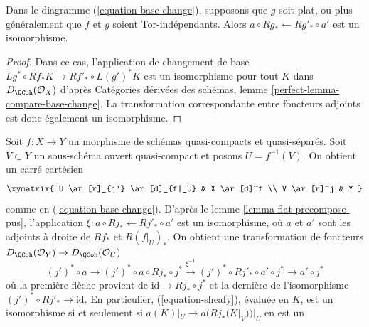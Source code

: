 \begin{lemma}
\label{lemma-flat-precompose-pus}
Dans le diagramme (\ref{equation-base-change}), supposons que $g$ soit plat, ou plus généralement que $f$ et $g$ soient Tor-indépendants. Alors $a \circ Rg_* \leftarrow Rg'_* \circ a'$ est un isomorphisme.
\end{lemma}

\begin{proof}
Dans ce cas, l'application de changement de base
$Lg^* \circ Rf_* K \longrightarrow Rf'_* \circ L(g')^*K$
est un isomorphisme pour tout $K$ dans $D_\QCoh(\mathcal{O}_X)$ d'après Catégories dérivées des schémas, lemme \ref{perfect-lemma-compare-base-change}. La transformation correspondante entre foncteurs adjoints est donc également un isomorphisme.
\end{proof}

\noindent
Soit $f : X \to Y$ un morphisme de schémas quasi-compacts et quasi-séparés. Soit $V \subset Y$ un sous-schéma ouvert quasi-compact et posons $U = f^{-1}(V)$. On obtient un carré cartésien
$$
\xymatrix{
U \ar[r]_{j'} \ar[d]_{f|_U} & X \ar[d]^f \\
V \ar[r]^j & Y
}
$$
comme en (\ref{equation-base-change}). D'après le lemme \ref{lemma-flat-precompose-pus}, l'application $\xi : a \circ Rj_* \leftarrow Rj'_* \circ a'$ est un isomorphisme, où $a$ et $a'$ sont les adjoints à droite de $Rf_*$ et $R(f|_U)_*$. On obtient une transformation de foncteurs $D_\QCoh(\mathcal{O}_Y) \to D_\QCoh(\mathcal{O}_U)$
\begin{equation}
\label{equation-sheafy}
(j')^* \circ a \to
(j')^* \circ a \circ Rj_* \circ j^* \xrightarrow{\xi^{-1}}
(j')^* \circ Rj'_* \circ a' \circ j^* \to a' \circ j^*
\end{equation}
où la première flèche provient de $\text{id} \to Rj_* \circ j^*$ et la dernière de l'isomorphisme $(j')^* \circ Rj'_* \to \text{id}$. En particulier, (\ref{equation-sheafy}), évaluée en $K$, est un isomorphisme si et seulement si $a(K)|_U \to a(Rj_*(K|_V))|_U$ en est un.

